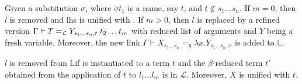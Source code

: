 \documentclass[sigconf,natbib=false,review]{acmart}
\newcommand{\appsep}{\ensuremath{\textcolor{lightgray}{\cdot}}}
\newcommand{\llambda}{\ensuremath{\mathcal{L}}\xspace}
\newcommand{\linkMacro}[1]{\ensuremath{#1}\texttt{-link}\xspace}
\newcommand{\linkbeta}{\linkMacro{\llambda}}
\newcommand{\linketaM}[3]{\ensuremath{#1 \vdash #2 =_\eta #3}}
\newcommand{\linkbetaM}[3]{\ensuremath{#1 \vdash #2 =_{\llambda} #3}}
\newcommand{\lhs}{lhs\xspace}
\newcommand{\rhs}{rhs\xspace}
\newcommand{\linkStore}{\texorpdfstring{\ensuremath{\mathbb{L}}\xspace}{L}}
\begin{document}
\begin{definition}[\progBetaLL]
  Given a substitution $\sigma$, where $\sigma t_1$ is a name, say $t$, and
  $t\notin s_1\dots s_n$. If $m = 0$, then $l$ is removed and \lhs is
  unified with \rhsBetaHead. If $m > 0$, then $l$ is replaced by a
  refined version $\linkbetaM{\Gamma}{T}{Y_{s_1\dots s_n,t}\appsep t_2\dots
  t_m}$ with reduced list of arguments and $Y$ being a fresh variable. Moreover,
  the new link \linketaM{\Gamma}{X_{s_1\dots s_n}}{\lambda x.Y_{s_1\dots s_n,x}}
  is added to \linkStore.   

  \label{def:progBetaLL}
\end{definition}

\begin{definition}[\progBetaRH]
  $l$ is removed from
  \linkStore if \rhsBetaHead is instantiated to a term $t$ and the
  $\beta$-reduced term $t'$ obtained from the application of $t$ to
  $l_1\dots l_m$ is in \llambda. Moreover, $X$ is unified with $t$.
  \label{def:progBetaRH}
\end{definition}

\end{document}
